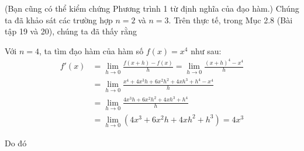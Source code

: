 \begin{minipage}[t]{0.71\textwidth}
  (Bạn cũng có thể kiểm chứng Phương trình 1 từ định nghĩa của đạo hàm.) Chúng ta đã khảo sát các trường hợp $n = 2$ và $n = 3$. Trên thực tế, trong Mục 2.8 (Bài tập 19 và 20), chúng ta đã thấy rằng
  \vspace{0.6em}

  \noindent
  \vspace{0.8em}

  Với $n = 4$, ta tìm đạo hàm của hàm số $f(x) = x^4$ như sau:
  \begin{align*}
    f'(x) &= \lim_{h \to 0} \frac{f(x + h) - f(x)}{h} = \lim_{h \to 0} \frac{(x + h)^4 - x^4}{h} \\[3pt]
    &= \lim_{h \to 0} \frac{x^4 + 4x^3h + 6x^2h^2 + 4xh^3 + h^4 - x^4}{h} \\[3pt]
    &= \lim_{h \to 0} \frac{4x^3h + 6x^2h^2 + 4xh^3 + h^4}{h} \\[3pt]
    &= \lim_{h \to 0} (4x^3 + 6x^2h + 4xh^2 + h^3) = 4x^3
  \end{align*}
  \vspace{0.2em}

  Do đó
  \vspace{0.5em}

  \noindent
\end{minipage}
